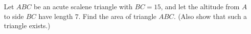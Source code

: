 Let $ABC$ be an acute scalene triangle with $BC=15$, and let the altitude from $A$ to side $BC$ have length $7$. Find the area of triangle $ABC$. (Also show that such a triangle exists.)
